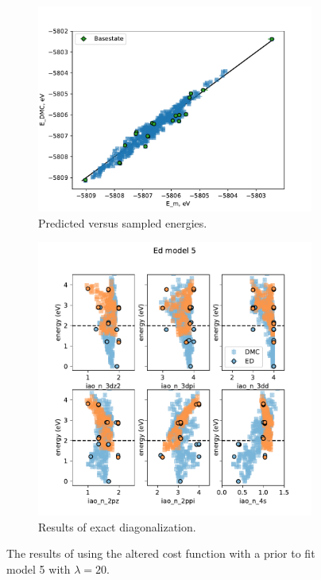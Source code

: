\documentclass{article}
\begin{document}
\begin{figure}[H]
\centering
\begin{subfigure}{.5\textwidth}
  \centering
  \includegraphics[width=\linewidth]{../qwalk/old/ub3lyp_s1_/analysis/figs/regr_m5_l20.pdf}
  \caption{Predicted versus sampled energies.}
  \label{fig:Fit1}
\end{subfigure}%
\begin{subfigure}{.5\textwidth}
  \centering
  \includegraphics[width=\linewidth]{../qwalk/old/ub3lyp_s1_/analysis/figs/ed_m5_l20.pdf}
  \caption{Results of exact diagonalization.}
  \label{fig:Fit2}
\end{subfigure}
\label{fig:Fit}
\caption{The results of using the altered cost function with a prior to fit model 5 with $\lambda = 20$.}
\end{figure}
\end{document}
